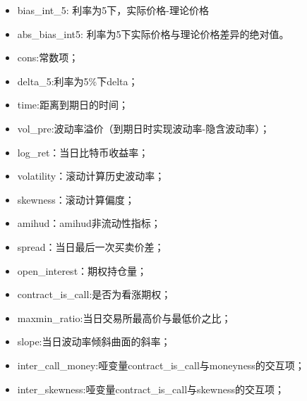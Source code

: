 \documentclass{article}
\begin{document}
    \begin{table}
    \end{table}
    \newpage
    \begin{itemize}
        \item bias\_int\_5: 利率为5下，实际价格-理论价格
        \item abs\_bias\_int5: 利率为5下实际价格与理论价格差异的绝对值。
        \item cons:常数项；
        \item delta\_5:利率为5$\%$下delta；
        \item time:距离到期日的时间；
        \item vol\_pre:波动率溢价（到期日时实现波动率-隐含波动率）；
        \item log\_ret：当日比特币收益率；
        \item volatility：滚动计算历史波动率；
        \item skewness：滚动计算偏度；
        \item amihud：amihud非流动性指标；
        \item spread：当日最后一次买卖价差；
        \item open\_interest：期权持仓量；
        \item contract\_is\_call:是否为看涨期权；
        \item maxmin\_ratio:当日交易所最高价与最低价之比；
        \item slope:当日波动率倾斜曲面的斜率；
        \item inter\_call\_money:哑变量contract\_is\_call与moneyness的交互项；
        \item inter\_skewness:哑变量contract\_is\_call与skewness的交互项；
    \end{itemize}

    
\end{document}
